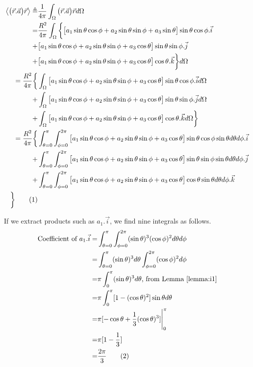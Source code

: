 \documentclass[]{article}
\newcommand\numberthis{\addtocounter{equation}{1}\tag{\theequation}}
\begin{document}
\begin{align*}
\left\langle \big(\vec{r}.\vec{a}\big)\vec{r} \right\rangle \triangleq& \frac{1}{4\pi}\int_{\Omega}\big(\vec{r}.\vec{a}\big)\vec{r} d\Omega \\
=&  \frac{ R^2}{4\pi}\int_{\Omega} \bigg\{ \big[a_1\sin\theta\cos\phi + a_2\sin\theta\sin\phi + a_3 \sin\theta\big] \sin\theta\cos\phi.\vec{i}\\ +& \big[a_1\sin\theta\cos\phi + a_2\sin\theta\sin\phi + a_3 \cos\theta\big]\sin\theta\sin\phi .\vec{j}\\
+& \big[a_1\sin\theta\cos\phi + a_2\sin\theta\sin\phi + a_3 \cos\theta\big] \cos\theta. \vec{k}\bigg\}d\Omega\\
= \frac{ R^2}{4\pi} \bigg\{&\int_{\Omega}\big[a_1\sin\theta\cos\phi + a_2\sin\theta\sin\phi + a_3 \cos\theta\big] \sin\theta\cos\phi.\vec{i}d\Omega\\ +& \int_{\Omega}\big[a_1\sin\theta\cos\phi + a_2\sin\theta\sin\phi + a_3 \cos\theta\big]\sin\theta\sin\phi .\vec{j}d\Omega\\
+& \int_{\Omega}\big[a_1\sin\theta\cos\phi + a_2\sin\theta\sin\phi + a_3 \cos\theta\big] \cos\theta. \vec{k} d\Omega\bigg\}\\
= \frac{ R^2}{4\pi} \bigg\{&\int_{\theta=0}^{\pi}\int_{\phi=0}^{2\pi}\big[a_1\sin\theta\cos\phi + a_2\sin\theta\sin\phi + a_3 \cos\theta\big] \sin\theta\cos\phi\sin\theta d\theta d\phi.\vec{i}\\
 +& \int_{\theta=0}^{\pi}\int_{\phi=0}^{2\pi}\big[a_1\sin\theta\cos\phi + a_2\sin\theta\sin\phi + a_3 \cos\theta\big]\sin\theta\sin\phi \sin\theta d\theta d\phi.\vec{j}\\
+& \int_{\theta=0}^{\pi}\int_{\phi=0}^{2\pi}\big[a_1\sin\theta\cos\phi + a_2\sin\theta\sin\phi + a_3 \cos\theta\big] \cos\theta \sin\theta d\theta d\phi.\vec{k}\\ \bigg\} \numberthis \label{eq:big-int}
\end{align*}

If we extract products such as $a_1.\vec{i}$, we find nine integrals as follows.
\begin{align*}
\text{Coefficient of }a_1.\vec{i} =&\int_{\theta=0}^{\pi}\int_{\phi=0}^{2\pi}(\sin\theta)^3(\cos\phi)^2 d\theta d\phi\\
=&\int_{\theta=0}^{\pi}(\sin\theta)^3d\theta\int_{\phi=0}^{2\pi}(\cos\phi)^2  d\phi\\
=&\pi \int_{0}^{\pi}(\sin\theta)^3d\theta\text{, from Lemma \ref{lemma:i1}}\\
=&\pi \int_{0}^{\pi} [1-(\cos \theta)^2] \sin\theta d\theta  \\
=& \pi [-\cos\theta+\frac{1}{3}(\cos\theta)^3]\Bigg|_0^{\pi} \\
=& \pi [1-\frac{1}{3}] \\
=& \frac{2\pi}{3}\numberthis \label{eq:a1-i}
\end{align*}
\end{document}
